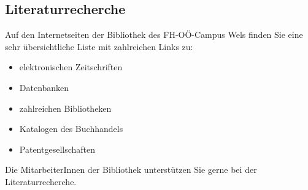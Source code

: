 \subsection*{Literaturrecherche}
Auf den Internetseiten der Bibliothek des FH-OÖ-Campus Wels finden Sie eine sehr übersichtliche Liste mit zahlreichen Links zu:
\begin{itemize}
	\item	elektronischen Zeitschriften
	\item	Datenbanken
	\item	zahlreichen Bibliotheken
	\item	Katalogen des Buchhandels
	\item	Patentgesellschaften
\end{itemize}
Die MitarbeiterInnen der Bibliothek unterstützen Sie gerne bei der Literaturrecherche.

